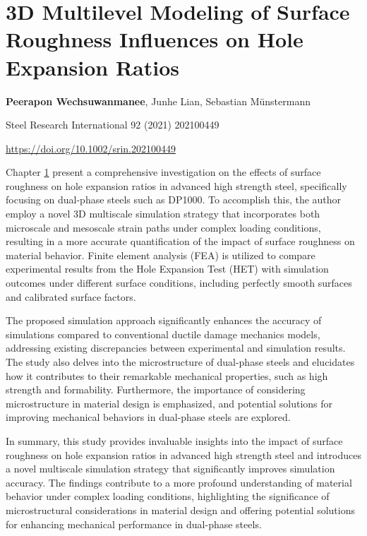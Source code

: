 \chapter[het]{3D Multilevel Modeling of Surface Roughness Influences on Hole Expansion Ratios}\label{ch:het}
\begin{center}

    \textbf{Peerapon Wechsuwanmanee}, Junhe Lian, Sebastian Münstermann
    
    \vspace{20pt}
    
    Steel Research International 92 (2021) 202100449
    
    \vspace{20pt}
    
    \url{https://doi.org/10.1002/srin.202100449}
    
    \vspace{40pt}
    
\end{center}
Chapter \ref{ch:het} present a comprehensive investigation on the effects of surface roughness on hole expansion ratios in advanced high strength steel, specifically focusing on dual-phase steels such as DP1000. To accomplish this, the author employ a novel 3D multiscale simulation strategy that incorporates both microscale and mesoscale strain paths under complex loading conditions, resulting in a more accurate quantification of the impact of surface roughness on material behavior. Finite element analysis (FEA) is utilized to compare experimental results from the Hole Expansion Test (HET) with simulation outcomes under different surface conditions, including perfectly smooth surfaces and calibrated surface factors.

The proposed simulation approach significantly enhances the accuracy of simulations compared to conventional ductile damage mechanics models, addressing existing discrepancies between experimental and simulation results. The study also delves into the microstructure of dual-phase steels and elucidates how it contributes to their remarkable mechanical properties, such as high strength and formability. Furthermore, the importance of considering microstructure in material design is emphasized, and potential solutions for improving mechanical behaviors in dual-phase steels are explored.

In summary, this study provides invaluable insights into the impact of surface roughness on hole expansion ratios in advanced high strength steel and introduces a novel multiscale simulation strategy that significantly improves simulation accuracy. The findings contribute to a more profound understanding of material behavior under complex loading conditions, highlighting the significance of microstructural considerations in material design and offering potential solutions for enhancing mechanical performance in dual-phase steels.